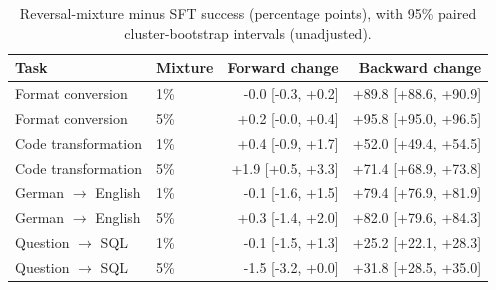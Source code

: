 \begin{table}[t]\centering\small
\begin{tabular}{llrr}\toprule
Task & Mixture & Forward change & Backward change \\\midrule
Format conversion & 1\% & -0.0 [-0.3, +0.2] & +89.8 [+88.6, +90.9] \\
Format conversion & 5\% & +0.2 [-0.0, +0.4] & +95.8 [+95.0, +96.5] \\
Code transformation & 1\% & +0.4 [-0.9, +1.7] & +52.0 [+49.4, +54.5] \\
Code transformation & 5\% & +1.9 [+0.5, +3.3] & +71.4 [+68.9, +73.8] \\
German $\to$ English & 1\% & -0.1 [-1.6, +1.5] & +79.4 [+76.9, +81.9] \\
German $\to$ English & 5\% & +0.3 [-1.4, +2.0] & +82.0 [+79.6, +84.3] \\
Question $\to$ SQL & 1\% & -0.1 [-1.5, +1.3] & +25.2 [+22.1, +28.3] \\
Question $\to$ SQL & 5\% & -1.5 [-3.2, +0.0] & +31.8 [+28.5, +35.0] \\
\bottomrule\end{tabular}
\caption{Reversal-mixture minus SFT success (percentage points), with 95\% paired cluster-bootstrap intervals (unadjusted).}\label{tab:preservation-paired}\end{table}
